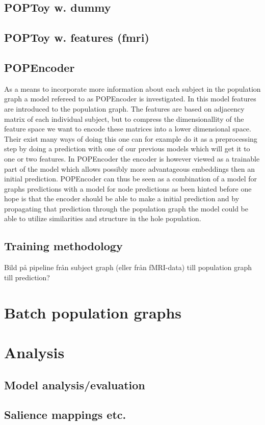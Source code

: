 \subsection{POPToy w. dummy}
\subsection{POPToy w. features (fmri)}
\subsection{POPEncoder}
As a means to incorporate more information about each subject in the population graph a model refereed to as POPEncoder is investigated. In this model features are introduced to the population graph. The features are based on adjacency matrix of each individual subject, but to compress the dimensionallity of the feature space we want to encode these matrices into a lower dimensional space. Their exist many ways of doing this one can for example do it as a preprocessing step by doing a prediction with one of our previous models which will get it to one or two features. In POPEncoder the encoder is however viewed as a trainable part of the model which allows possibly more advantageous embeddings then an initial prediction. POPEncoder can thus be seen as a combination of a model for graphs predictions with a model for node predictions as been hinted before one hope is that the encoder should be able to make a initial prediction and by propagating that prediction through the population graph the model could be able to utilize similarities and structure in the hole population.

\subsection{Training methodology} %
Bild på pipeline från subject graph (eller från fMRI-data) till population graph till prediction?

\section{Batch population graphs}

\section{Analysis}
\subsection{Model analysis/evaluation}
\subsection{Salience mappings etc.}



